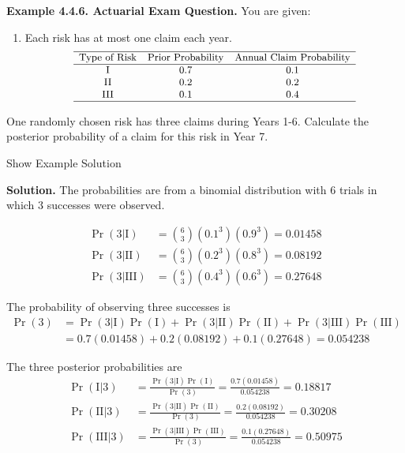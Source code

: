 \documentclass[]{book}
\providecommand{\tightlist}{%
  \setlength{\itemsep}{0pt}\setlength{\parskip}{0pt}}
\theoremstyle{definition}
\theoremstyle{definition}
\theoremstyle{definition}
\theoremstyle{remark}
\begin{document}
\textbf{Example 4.4.6. Actuarial Exam Question.} You are given:

\begin{enumerate}
\def\labelenumi{(\roman{enumi})}
\tightlist
\item
  Each risk has at most one claim each year. \[
  {\small
  \begin{array}{ccc}
  \hline
  \text{Type of Risk} & \text{Prior Probability} & \text{Annual Claim Probability} \\
  \hline
  \text{I} & 0.7 & 0.1 \\
  \text{II} & 0.2 & 0.2 \\
  \text{III} & 0.1 & 0.4 \\
  \hline
  \end{array}
  }
  \]
\end{enumerate}

One randomly chosen risk has three claims during Years 1-6. Calculate
the posterior probability of a claim for this risk in Year 7.

Show Example Solution

\hypertarget{toggleExampleSelect.4.6}{}
\textbf{Solution.} The probabilities are from a binomial distribution
with 6 trials in which 3 successes were observed.

\[
\begin{aligned} 
\Pr(3|\text{I}) &= {6 \choose 3} (0.1^3)(0.9^3) = 0.01458 \\
\Pr(3|\text{II}) &= {6 \choose 3} (0.2^3)(0.8^3) = 0.08192 \\
\Pr(3|\text{III}) &= {6 \choose 3} (0.4^3)(0.6^3) = 0.27648
\end{aligned}
\]

The probability of observing three successes is \[
\begin{aligned} \Pr(3) &= \Pr(3|\text{I})\Pr(\text{I}) + \Pr(3|\text{II})\Pr(\text{II}) + \Pr(3|\text{III})\Pr(\text{III}) \\
&=  0.7(0.01458) + 0.2(0.08192) + 0.1(0.27648) = 0.054238
\end{aligned}
\]

The three posterior probabilities are \[
\begin{aligned}
\Pr(\text{I}|3) &= \frac{\Pr(3|\text{I})\Pr(\text{I})}{\Pr(3)} = \frac{0.7(0.01458)}{0.054238} = 0.18817 \\
\Pr(\text{II}|3) &= \frac{\Pr(3|\text{II})\Pr(\text{II})}{\Pr(3)} = \frac{0.2(0.08192)}{0.054238} = 0.30208 \\
\Pr(\text{III}|3) &= \frac{\Pr(3|\text{III})\Pr(\text{III})}{\Pr(3)} = \frac{0.1(0.27648)}{0.054238} = 0.50975 
\end{aligned}
\]
\end{document}
